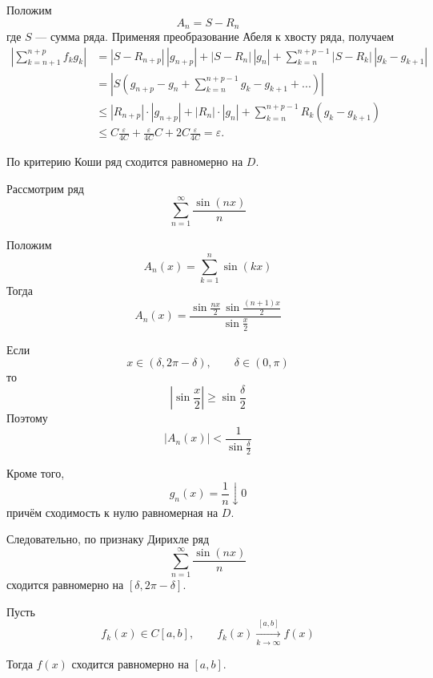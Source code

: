 \documentclass[12pt,a4paper]{article}
\begin{document}
\begin{proofbox}{}
    Положим
    \[
    A_n=S-R_n
    \]
    где $S$ --- сумма ряда. Применяя преобразование Абеля к хвосту ряда, получаем
    \[
    \begin{aligned}
    \left|
    \sum_{k=n+1}^{n+p}f_k g_k
    \right|
    &=
    |S - R_{n+p}|\,|g_{n+p}|
    +
    |S - R_n|\,|g_n|
    +
    \sum_{k=n}^{n+p-1}|S - R_k|\,|g_k-g_{k+1}|
    \\
    &=
    \left|
    S(g_{n+p}-g_n+\sum_{k=n}^{n+p-1}g_k-g_{k+1} + ...)
    \right|
    \\
    &\leq
    |R_{n+p}| \cdot |g_{n+p}| + |R_n| \cdot |g_n| + \sum_{k=n}^{n+p-1}R_k(g_k-g_{k+1})
    \\
    &\leq
    C\frac{\varepsilon}{4C}
    +
    \frac{\varepsilon}{4C}C
    +
    2C\frac{\varepsilon}{4C}
    =
    \varepsilon.
    \end{aligned}
    \]

    По критерию Коши ряд сходится равномерно на $D$.

\end{proofbox}

\begin{example}

    Рассмотрим ряд
    \[
        \sum_{n=1}^{\infty}\frac{\sin(nx)}{n}
    \]

    Положим
    \[
        A_n(x)=\sum_{k=1}^{n}\sin(kx)
    \]
    Тогда
    \[
        A_n(x)
        =
        \frac{\sin\frac{nx}{2}\,
        \sin\frac{(n+1)x}{2}}
        {\sin\frac{x}{2}}
    \]

    Если
    \[
        x\in(\delta,2\pi-\delta),
        \qquad
        \delta\in(0,\pi)
    \]
    то
    \[
        \left|\sin\frac{x}{2}\right|
        \geq
        \sin\frac{\delta}{2}
    \]
    Поэтому
    \[
        |A_n(x)|
        <
        \frac{1}{\sin\frac{\delta}{2}}
    \]

    Кроме того,
    \[
        g_n(x)=\frac1n\downarrow0
    \]
    причём сходимость к нулю равномерная на $D$.

    Следовательно, по признаку Дирихле ряд
    \[
        \sum_{n=1}^{\infty}\frac{\sin(nx)}{n}
    \]
    сходится равномерно на $[\delta,2\pi-\delta]$.

\end{example}

\begin{lemma}

    Пусть
    \[
        f_k(x)\in C[a,b],
        \qquad
        f_k(x)\xrightarrow[k\to\infty]{[a,b]}f(x)
    \]

Тогда $f(x)$ сходится равномерно на $[a,b]$.

\end{lemma}
\end{document}

